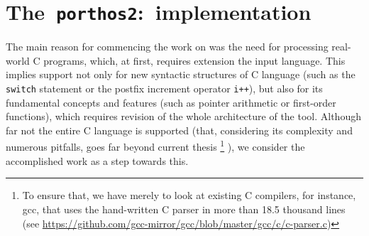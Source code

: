\chapter{The~\texttt{porthos2}:~implementation}
\label{ch:impl}

The main reason for commencing the work on \porthos[2] was the need for processing real-world C programs, which, at first, requires extension the input language.
This implies support not only for new syntactic structures of C language (such as the \texttt{switch} statement or the postfix increment operator \texttt{i++}), but also for its fundamental concepts and features (such as pointer arithmetic or first-order functions), which requires revision of the whole architecture of the tool.
Although far not the entire C language is supported (that, considering its complexity and numerous pitfalls, goes far beyond current thesis%
\footnote{To ensure that, we have merely to look at existing C compilers, for instance, gcc, that uses the hand-written C parser in more than 18.5 thousand lines (see \url{https://github.com/gcc-mirror/gcc/blob/master/gcc/c/c-parser.c})}%
), we consider the accomplished work as a step towards this.





